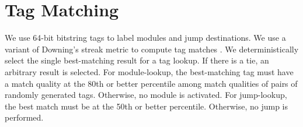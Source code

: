\section{Tag Matching}

We use 64-bit bitstring tags to label modules and jump destinations.
We use a variant of Downing's streak metric to compute tag matches \citep{downing2015intelligence}.
We deterministically select the single best-matching result for a tag lookup.
If there is a tie, an arbitrary result is selected.
For module-lookup, the best-matching tag must have a match quality at the 80th or better percentile among match qualities of pairs of randomly generated tags.
Otherwise, no module is activated.
For jump-lookup, the best match must be at the 50th or better percentile.
Otherwise, no jump is performed.
